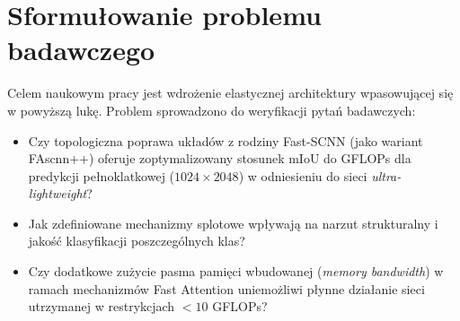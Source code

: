 \section{Sformułowanie problemu badawczego}
Celem naukowym pracy jest wdrożenie elastycznej architektury wpasowującej się w powyższą lukę. Problem sprowadzono do weryfikacji pytań badawczych:
\begin{itemize}
    \item Czy topologiczna poprawa układów z rodziny Fast-SCNN (jako wariant FAscnn++) oferuje zoptymalizowany stosunek mIoU do GFLOPs dla predykcji pełnoklatkowej ($1024 \times 2048$) w odniesieniu do sieci \textit{ultra-lightweight}?
    \item Jak zdefiniowane mechanizmy splotowe wpływają na narzut strukturalny i jakość klasyfikacji poszczególnych klas?
    \item Czy dodatkowe zużycie pasma pamięci wbudowanej (\textit{memory bandwidth}) w ramach mechanizmów Fast Attention uniemożliwi płynne działanie sieci utrzymanej w restrykcjach $<10$ GFLOPs?
\end{itemize}
